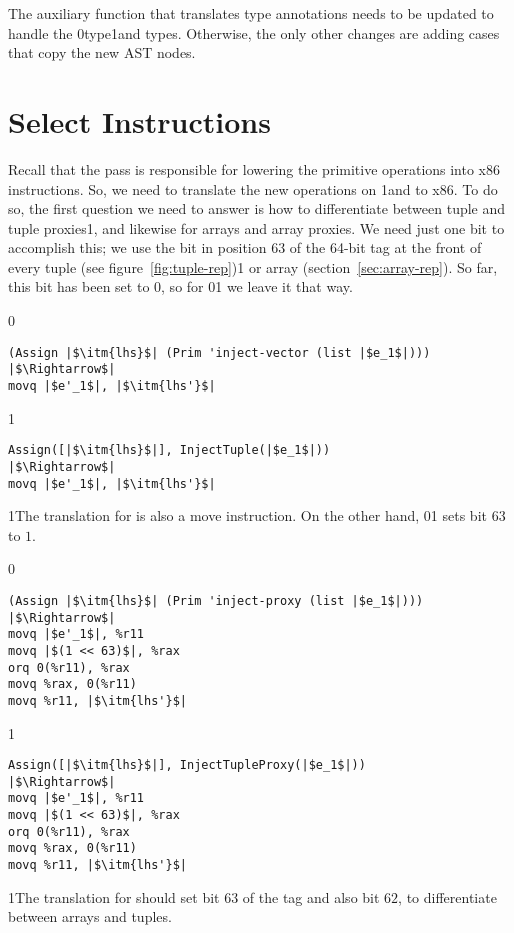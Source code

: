 \documentclass[7x10]{TimesAPriori_MIT}%
\def\racketEd{0}
\def\pythonEd{1}
\def\edition{1}
\newcommand{\racket}[1]{{\if\edition\racketEd{#1}\fi}}
\newcommand{\pythonColor}[0]{}
\newcommand{\python}[1]{{\if\edition\pythonEd\pythonColor #1\fi}}
\numberwithin{theorem}{chapter}
\numberwithin{definition}{chapter}
\numberwithin{equation}{chapter}
\begin{document}
The auxiliary function that translates type annotations needs to be
updated to handle the \PTUPLETYNAME{}
\racket{type}\python{and \PARRAYTYNAME{} types}.
%
Otherwise, the only other changes are adding cases that copy the new
AST nodes.

\section{Select Instructions }
\label{sec:select-instructions-gradual}

Recall that the  pass is responsible for
lowering the primitive operations into x86 instructions.  So, we need
to translate the new operations on \PTUPLETYNAME{} \python{and \PARRAYTYNAME{}}
to x86.  To do so, the first question we need to answer is how to
differentiate between tuple and tuple proxies\python{, and likewise for
arrays and array proxies}.  We need just one bit to accomplish this;
we use the bit in position $63$ of the 64-bit tag at the front of
every tuple (see figure~\ref{fig:tuple-rep})\python{ or array
(section~\ref{sec:array-rep})}. So far, this bit has been set to $0$,
so for \racket{}\python{} we leave
it that way.
{\if\edition\racketEd    
\begin{lstlisting}
(Assign |$\itm{lhs}$| (Prim 'inject-vector (list |$e_1$|)))
|$\Rightarrow$|  
movq |$e'_1$|, |$\itm{lhs'}$|
\end{lstlisting}
\fi}
{\if\edition\pythonEd\pythonColor    
\begin{lstlisting}
Assign([|$\itm{lhs}$|], InjectTuple(|$e_1$|))
|$\Rightarrow$|  
movq |$e'_1$|, |$\itm{lhs'}$|
\end{lstlisting}
\fi}
\python{The translation for  is also a move instruction.}
\noindent On the other hand,
\racket{}\python{} sets bit
$63$ to $1$.
%
{\if\edition\racketEd
\begin{lstlisting}  
(Assign |$\itm{lhs}$| (Prim 'inject-proxy (list |$e_1$|)))
|$\Rightarrow$|  
movq |$e'_1$|, %r11
movq |$(1 << 63)$|, %rax
orq 0(%r11), %rax
movq %rax, 0(%r11)
movq %r11, |$\itm{lhs'}$|
\end{lstlisting}
\fi}
{\if\edition\pythonEd\pythonColor
\begin{lstlisting}  
Assign([|$\itm{lhs}$|], InjectTupleProxy(|$e_1$|))
|$\Rightarrow$|  
movq |$e'_1$|, %r11
movq |$(1 << 63)$|, %rax
orq 0(%r11), %rax
movq %rax, 0(%r11)
movq %r11, |$\itm{lhs'}$|
\end{lstlisting}
\fi}
\python{\noindent The translation for  should set bit $63$
  of the tag and also bit $62$, to differentiate between arrays and tuples.}
\end{document}

